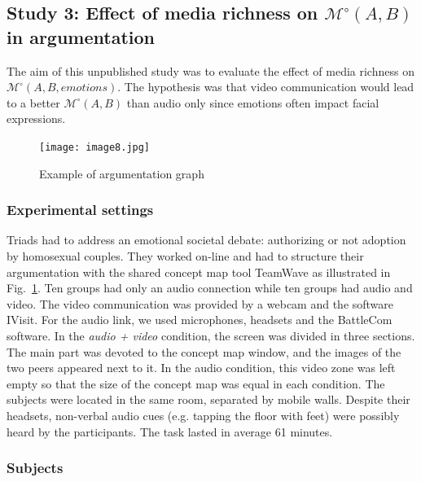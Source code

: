 \documentclass[natbib]{svjour3}
\newcommand{\eg}{e.g.\xspace}
\newcommand{\Model}[3]{{$\mathcal{M}^{\circ}(#1, #2, #3)$}}
\newcommand{\gModel}[2]{{$\mathcal{M}^{\circ}(#1, #2)$}}
\begin{document}
\subsection{{\bf Study 3}:  Effect of media richness on \gModel{A}{B} in argumentation}

%
The aim of this unpublished study was to evaluate the effect of media richness
on \Model{A}{B}{emotions}.  The hypothesis was that video communication would
lead to a better \gModel{A}{B} than audio only since emotions often impact 
facial expressions.

\begin{figure}[ht!]
        \centering
        \texttt{[image: image8.jpg]}
        \caption{Example of argumentation graph}
        \label{study3:argumentation_graph}
\end{figure}


\subsubsection*{Experimental settings} 

Triads had to address an emotional societal debate: authorizing or not adoption
by homosexual couples. They worked on-line and had to structure their
argumentation with the shared concept map tool {\sc TeamWave} as illustrated in
Fig.~\ref{study3:argumentation_graph}. Ten groups had only an audio connection
while ten groups had audio and video. The video communication was provided by a
webcam and the software {\sc IVisit}. For the audio link, we used microphones,
headsets and the {\sc BattleCom} software. In the \emph{audio + video}
condition, the screen was divided in three sections. The main part was devoted
to the concept map window, and the images of the two peers appeared next to it.
In the audio condition, this video zone was left empty so that the size of the
concept map was equal in each condition. The subjects were located in the same
room, separated by mobile walls. Despite their headsets, non-verbal audio cues
(\eg tapping the floor with feet) were possibly heard by the participants. The
task lasted in average 61 minutes.

\subsubsection*{Subjects}
\end{document}

